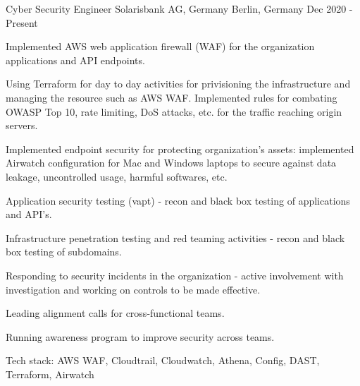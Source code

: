 
\begin{cventries}

\cventry
    {Cyber Security Engineer} %
    {Solarisbank AG, Germany} %
    {Berlin, Germany} %
    {Dec 2020 - Present} %
    {
      \begin{cvitems} %
        \item {Implemented AWS web application firewall (WAF) for the organization applications and API endpoints.
        \item Using Terraform for day to day activities for privisioning the infrastructure and managing the resource such as AWS WAF. Implemented rules for combating OWASP Top 10, rate limiting, DoS attacks, etc. for the traffic reaching origin servers.}
        \item {Implemented endpoint security for protecting organization's assets: implemented Airwatch configuration for Mac and Windows laptops to secure against data leakage, uncontrolled usage, harmful softwares, etc.}
        \item {Application security testing (vapt) - recon and black box testing of applications and API's.}
        \item {Infrastructure penetration testing and red teaming activities  - recon and black box testing of subdomains.}
        \item {Responding to security incidents in the organization - active involvement with investigation and working on controls to be made effective.}
        \item {Leading alignment calls for cross-functional teams.}
        \item {Running awareness program to improve security across teams.}
        \item {Tech stack: AWS WAF, Cloudtrail, Cloudwatch, Athena, Config, DAST, Terraform, Airwatch}
      \end{cvitems}
    }


\end{cventries}
